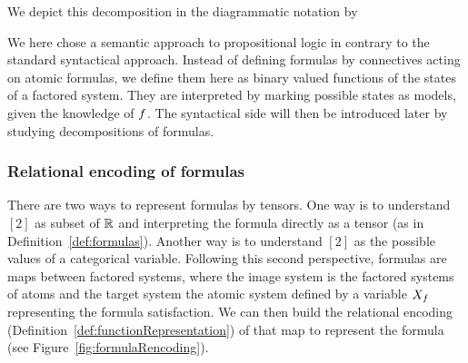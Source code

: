 We depict this decomposition in the diagrammatic notation by
\begin{center}
	
\end{center}









We here chose a semantic approach to propositional logic in contrary to the standard syntactical approach.
Instead of defining formulas by connectives acting on atomic formulas, we define them here as binary valued functions of the states of a factored system.
They are interpreted by marking possible states as models, given the knowledge of $f$.
The syntactical side will then be introduced later by studying decompositions of formulas.


%	


\subsubsection{Relational encoding of formulas}


There are two ways to represent formulas by tensors.
One way is to understand $[2]$ as subset of $\mathbb{R}$ and interpreting the formula directly as a tensor (as in Definition~\ref{def:formulas}).
Another way is to understand $[2]$ as the possible values of a categorical variable.
Following this second perspective, formulas are maps between factored systems, where the image system is the factored systems of atoms and the target system the atomic system defined by a variable $X_{f}$ representing the formula satisfaction.
We can then build the relational encoding (Definition~\ref{def:functionRepresentation}) of that map to represent the formula (see Figure~\ref{fig:formulaRencoding}).

